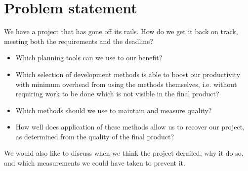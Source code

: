 \section{Problem statement}
We have a project that has gone off its rails. How do we get it back on track, meeting both the requirements and the deadline?
\begin{itemize}
\item Which planning tools can we use to our benefit?
\item Which selection of development methods is able to boost our productivity with minimum overhead from using the methods themselves, i.e. without requiring work to be done which is not visible in the final product?
\item Which methods should we use to maintain and measure quality?
\item How well does application of these methods allow us to recover our project, as determined from the quality of the final product?
\end{itemize}
We would also like to discuss when we think the project derailed, why it do so, and which measurements we could have taken to prevent it.
\newpage
